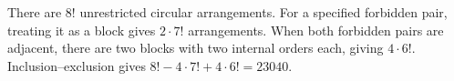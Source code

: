 There are $8!$ unrestricted circular arrangements. For a specified forbidden pair, treating it as a block gives $2\cdot7!$ arrangements. When both forbidden pairs are adjacent, there are two blocks with two internal orders each, giving $4\cdot6!$. Inclusion--exclusion gives $8!-4\cdot7!+4\cdot6!=\boxed{23040}$.
